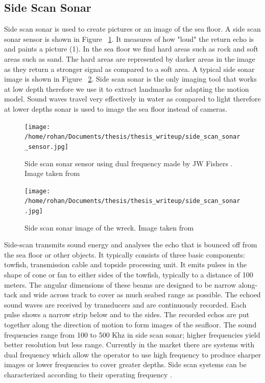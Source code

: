 \documentclass[12pt]{dalcsthesis}
\begin{document}
\subsection{Side Scan Sonar} 
Side scan sonar is used to create pictures or an image of the sea floor. A side scan sonar sensor is shown in Figure ~\ref{fig- side scan sonar sensor}. It measures of how "loud" the return echo is and paints a picture (1). In the sea floor we find  hard areas such as rock and soft areas such as sand. The hard areas are represented by darker areas in the image as they return a stronger signal as compared to a soft area. A typical side sonar image is shown in Figure ~\ref{fig- side scan sonar image}. Side scan sonar is the only imaging tool that works at low depth therefore we use it to extract landmarks for adapting the motion model. Sound waves travel very effectively in water as compared to light therefore at lower depths sonar is used to image the sea floor instead of cameras. 
\begin{figure}
  \centering
     {\texttt{[image: /home/rohan/Documents/thesis/thesis\_writeup/side\_scan\_sonar\_sensor.jpg]}}
  \caption{\label{fig- side scan sonar sensor} Side scan sonar sensor using dual frequency made by JW Fishers . Image taken from \cite{side_sonar_fisheries_url}}
\end{figure}

\begin{figure}
  \centering
     {\texttt{[image: /home/rohan/Documents/thesis/thesis\_writeup/side\_scan\_sonar.jpg]}}
  \caption{\label{fig- side scan sonar image} Side scan sonar image of the wreck. Image taken from \cite{side_sonar_url}}
\end{figure}

Side-scan transmits sound energy and analyses the echo that is bounced off from the sea floor or other objects. It typically consists of three basic components: towfish, transmission cable and topside processing unit. It emits pulses in the shape of cone or fan to either sides of the towfish, typically to a distance of 100 meters. The angular dimensions of these beams are designed to be narrow along-tack and wide across track to cover as much seabed range as possible.  The echoed sound waves are received by transducers and are continuously recorded. Each pulse shows a narrow strip below and to the sides.  The recorded echos are put together along the direction of motion to form images of the seafloor. The sound frequencies range from 100 to 500 Khz in side scan sonar; higher frequencies yield better resolution but less range. Currently in the market there are systems with dual frequency which allow the operator to use high frequency to produce sharper images or lower frequencies to cover greater depths. Side scan 
systems can be characterized according to their operating frequency \cite{side_sonar_usgs_url}.
\end{document}
